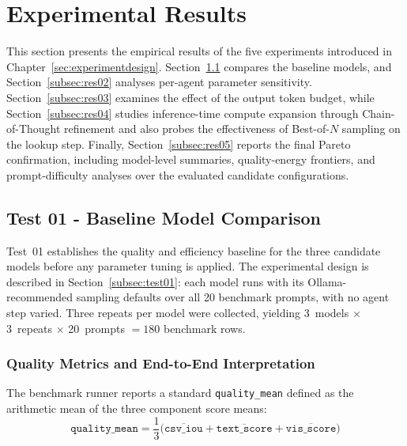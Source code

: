 \section{Experimental Results}
\label{sec:experiments}

This section presents the empirical results of the five experiments introduced
in Chapter~\ref{sec:experimentdesign}. Section~\ref{subsec:res01} compares the
baseline models, and Section~\ref{subsec:res02} analyses per-agent parameter
sensitivity. Section~\ref{subsec:res03} examines the effect of the output
token budget, while Section~\ref{subsec:res04} studies inference-time compute
expansion through Chain-of-Thought refinement and also probes the effectiveness
of Best-of-$N$ sampling on the lookup step. Finally,
Section~\ref{subsec:res05} reports the final Pareto confirmation, including
model-level summaries, quality-energy frontiers, and prompt-difficulty analyses
over the evaluated candidate configurations.

\subsection{Test 01 - Baseline Model Comparison}
\label{subsec:res01}

Test~01 establishes the quality and efficiency baseline for the three
candidate models before any parameter tuning is applied. The experimental
design is described in Section~\ref{subsec:test01}: each model runs with its
Ollama-recommended sampling defaults over all 20 benchmark prompts, with no
agent step varied. Three repeats per model were collected, yielding
3~models $\times$ 3~repeats $\times$ 20~prompts $= 180$ benchmark rows.

\subsubsection{Quality Metrics and End-to-End Interpretation}
\label{subsubsec:qualitymetrics}

The benchmark runner reports a standard \texttt{quality\_mean} defined as the
arithmetic mean of the three component score means:
\begin{equation}
\texttt{quality\_mean} = \frac{1}{3}\bigl(\overline{\texttt{csv\_iou}} +
                                           \overline{\texttt{text\_score}} +
                                           \overline{\texttt{vis\_score}}\bigr)
\label{eq:quality_mean}
\end{equation}


